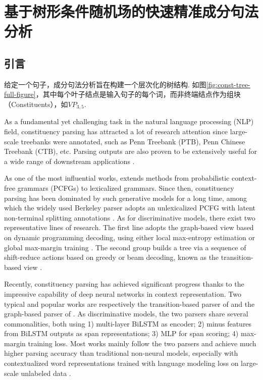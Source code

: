 \chapter{基于树形条件随机场的快速精准成分句法分析}
\label{cha:con-crf}

\section{引言}

给定一个句子，成分句法分析旨在构建一个层次化的树结构. 如图\ref{fig:const-tree-full-figure}，其中每个叶子结点是输入句子的每个词，而非终端结点作为组块（Constituents），如\texttt{$VP_{3,5}$}.

As a fundamental yet challenging task in the natural language processing (NLP) field, constituency parsing has attracted a lot of research attention since large-scale treebanks were annotated,  such as Penn Treebank (PTB), Penn Chinese Treebank (CTB), etc.
Parsing outputs are also proven to be extensively useful for a wide range of downstream applications \cite{akoury-etal-2019-syntactically,wang-etal-2018-tree}.

As one of the most influential works, \cite{collins-1997-three} extends methods from probabilistic context-free grammars (PCFGs) to lexicalized grammars.
Since then, constituency parsing has been dominated by such generative models for a long time, among which
the widely used Berkeley parser adopts an unlexicalized PCFG with latent non-terminal splitting annotations \cite{matsuzaki-etal-2005-probabilistic,petrov-klein-2007-improved}.
As for discriminative models, there exist two representative lines of research.
The first line adopts the graph-based view based on dynamic programming decoding, using either local max-entropy estimation \cite{kaplan-etal-2004-speed} or global max-margin training \cite{taskar-etal-2004-max}.
The second group builds a tree via a sequence of shift-reduce actions based on greedy or beam decoding, known as the transition-based view \cite{sagae-lavie-2005-classifier,zhu-etal-2013-fast}.




Recently, constituency parsing has achieved significant progress thanks to the impressive capability of deep neural networks in context representation.
Two typical and popular works are respectively the transition-based parser of \cite{cross-huang-2016-span} and the graph-based parser of \cite{stern-etal-2017-minimal}.
As discriminative models, the two parsers share several commonalities, both using 1) multi-layer BiLSTM as encoder; 2) minus features from BiLSTM outputs as span representations; 3) MLP for span scoring; 4) max-margin training loss.
Most works \cite{gaddy-etal-2018-whats,kitaev-klein-2018-constituency} mainly follow the two parsers and achieve much higher parsing accuracy than traditional non-neural models, especially with contextualized word representations trained with language modeling loss on large-scale unlabeled data \cite{peters-etal-2018-deep,devlin-etal-2019-bert}.

